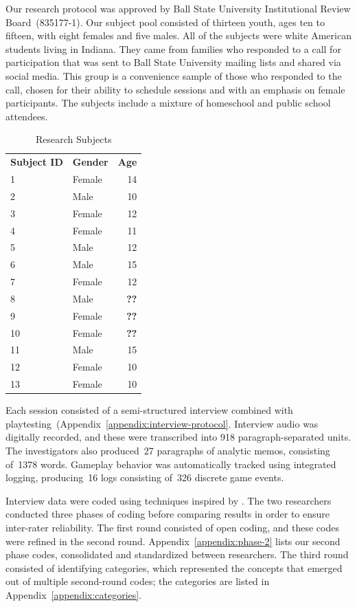 \documentclass[letterpaper]{article}
\begin{document}
Our research protocol was approved by Ball State University
Institutional Review Board~(835177-1). 
Our subject pool consisted of thirteen youth, ages ten to fifteen,
with eight females and five males. All of the subjects were
white American students living in Indiana. 
They came from families who responded to a call for participation that
was sent to Ball State University mailing lists and shared via social
media. This group is a convenience sample of those who responded to the
call, chosen for their ability to schedule sessions and with an emphasis
on female participants. The subjects include a mixture of homeschool
and public school attendees.

\begin{table}
\centering
\begin{tabular}{llr}
\textbf{Subject ID} & \textbf{Gender} & \textbf{Age}\\
1 & Female & 14\\
2 & Male & 10\\
3 & Female & 12\\
4 & Female & 11\\
5 & Male & 12\\
6 & Male & 15\\
7 & Female & 12\\
8 & Male & \textbf{??}\\
9 & Female & \textbf{??}\\
10 & Female & \textbf{??}\\
11 & Male & 15\\
12 & Female & 10\\
13 & Female & 10\\
\end{tabular}
\caption{Research Subjects}
\end{table}

Each session consisted of a semi-structured interview combined with
playtesting~(Appendix~\ref{appendix:interview-protocol}.
Interview audio was digitally recorded, and these were transcribed
into 918 paragraph-separated units. 
The investigators also 
produced~27 paragraphs of analytic memos,
consisting of~1378 words.
Gameplay behavior was automatically tracked using integrated logging, 
producing~16 logs consisting of~326 discrete game events.

Interview data were coded using techniques inspired by
\citet{Saldana2009}. The two researchers conducted three phases 
of coding before comparing results in order to ensure inter-rater
reliability. The first round consisted of open coding, and these
codes were refined in the second round. 
Appendix~\ref{appendix:phase-2} lists our second phase codes,
consolidated and standardized between researchers.
The third round consisted of
identifying categories, which represented the concepts that emerged
out of multiple second-round codes; the categories are listed in
Appendix~\ref{appendix:categories}.
\end{document}

